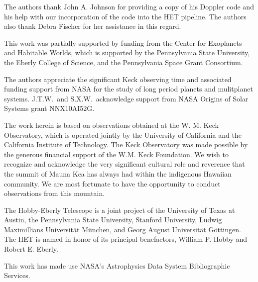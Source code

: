 \documentclass{emulateapj}
\begin{document}
\begin{CJK*}{UTF8}{gbsn}
\acknowledgements
The authors thank John A. Johnson for providing a copy of his Doppler
code and his help with our incorporation of the code into the HET
pipeline.  The authors also thank Debra Fischer for her assistance in
this regard.

This work was partially supported by funding from the Center for
Exoplanets and Habitable Worlds, which is supported by the
Pennsylvania State University, the Eberly College of Science, and the
Pennsylvania Space Grant Consortium.

The authors appreciate the significant Keck observing time and
associated funding support from NASA for the study of long period
planets and mulitplanet systems.
%
J.T.W.\ and S.X.W.\ acknowledge support from NASA Origins of Solar
Systems grant NNX10AI52G.

The work herein is based on observations obtained at the W. M. Keck
Observatory, which is operated jointly by the University of California
and the California Institute of Technology.  The Keck Observatory was
made possible by the generous financial support of the W.M. Keck
Foundation.  We wish to recognize and acknowledge the very significant
cultural role and reverence that the summit of Mauna Kea has always
had within the indigenous Hawaiian community.  We are most fortunate
to have the opportunity to conduct observations from this mountain.

The Hobby-Eberly Telescope is a joint project of the University of
Texas at Austin, the Pennsylvania State University, Stanford
University, Ludwig Maximillians Universit\"at M\"unchen, and Georg
August Universit\"at G\"ottingen. The HET is named in honor of its
principal benefactors, William P. Hobby and Robert E. Eberly.

This work has made use NASA’s Astrophysics Data System Bibliographic Services.


\end{CJK*}


\end{document}
